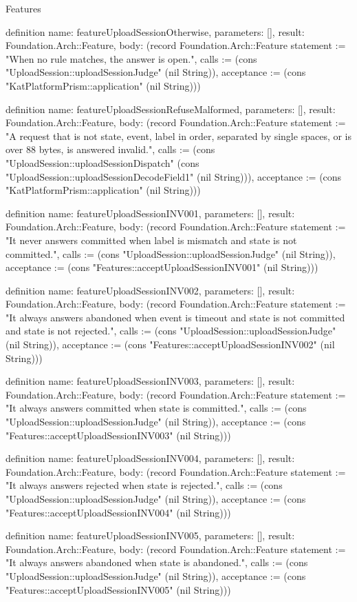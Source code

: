 \begin{lexlean}{Features}
\begin{semanticmodule}
definition{
  name: featureUploadSessionOtherwise,
  parameters: [],
  result: Foundation.Arch::Feature,
  body: (record Foundation.Arch::Feature {statement := "When no rule matches, the answer is open.", calls := (cons "UploadSession::uploadSessionJudge" (nil String)), acceptance := (cons "KatPlatformPrism::application" (nil String))})
}

definition{
  name: featureUploadSessionRefuseMalformed,
  parameters: [],
  result: Foundation.Arch::Feature,
  body: (record Foundation.Arch::Feature {statement := "A request that is not state, event, label in order, separated by single spaces, or is over 88 bytes, is answered invalid.", calls := (cons "UploadSession::uploadSessionDispatch" (cons "UploadSession::uploadSessionDecodeField1" (nil String))), acceptance := (cons "KatPlatformPrism::application" (nil String))})
}

definition{
  name: featureUploadSessionINV001,
  parameters: [],
  result: Foundation.Arch::Feature,
  body: (record Foundation.Arch::Feature {statement := "It never answers committed when label is mismatch and state is not committed.", calls := (cons "UploadSession::uploadSessionJudge" (nil String)), acceptance := (cons "Features::acceptUploadSessionINV001" (nil String))})
}

definition{
  name: featureUploadSessionINV002,
  parameters: [],
  result: Foundation.Arch::Feature,
  body: (record Foundation.Arch::Feature {statement := "It always answers abandoned when event is timeout and state is not committed and state is not rejected.", calls := (cons "UploadSession::uploadSessionJudge" (nil String)), acceptance := (cons "Features::acceptUploadSessionINV002" (nil String))})
}

definition{
  name: featureUploadSessionINV003,
  parameters: [],
  result: Foundation.Arch::Feature,
  body: (record Foundation.Arch::Feature {statement := "It always answers committed when state is committed.", calls := (cons "UploadSession::uploadSessionJudge" (nil String)), acceptance := (cons "Features::acceptUploadSessionINV003" (nil String))})
}

definition{
  name: featureUploadSessionINV004,
  parameters: [],
  result: Foundation.Arch::Feature,
  body: (record Foundation.Arch::Feature {statement := "It always answers rejected when state is rejected.", calls := (cons "UploadSession::uploadSessionJudge" (nil String)), acceptance := (cons "Features::acceptUploadSessionINV004" (nil String))})
}

definition{
  name: featureUploadSessionINV005,
  parameters: [],
  result: Foundation.Arch::Feature,
  body: (record Foundation.Arch::Feature {statement := "It always answers abandoned when state is abandoned.", calls := (cons "UploadSession::uploadSessionJudge" (nil String)), acceptance := (cons "Features::acceptUploadSessionINV005" (nil String))})
}


\end{semanticmodule}
\end{lexlean}
